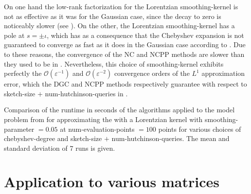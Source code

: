 On one hand the low-rank factorization for the Lorentzian \gls{smoothing-kernel}
is not as effective as it was for the Gaussian case, since the decay to zero
is noticeably slower (see ). On the
other, the Lorentzian \gls{smoothing-kernel} has a pole at $s = \pm \iota$, which
has as a consequence that the Chebyshev expansion is not guaranteed to converge
as fast as it does in the Gaussian case according to .
Due to these reasons, the convergence of the \gls{NC} and \gls{NCPP} methods
are slower than they used to be in .
Nevertheless, this choice of \gls{smoothing-kernel} exhibits perfectly the 
$\mathcal{O}(\varepsilon^{-1})$ and $\mathcal{O}(\varepsilon^{-2})$ convergence
orders of the $L^1$ approximation error, which the \gls{DGC} and \gls{NCPP}
methods respectively guarantee with respect to
\gls{sketch-size} $+$ \gls{num-hutchinson-queries} in .\\

\begin{table}[ht]
    \caption{Comparison of the runtime in seconds of the algorithms applied to the model problem
    from 
    for approximating the  with a Lorentzian kernel with
    \gls{smoothing-parameter} $=0.05$ at \gls{num-evaluation-points} $=100$
    points for various choices of \gls{chebyshev-degree} and \gls{sketch-size} $+$ \gls{num-hutchinson-queries}.
    The mean and standard deviation of 7 runs is given.}
    \label{tab:5-experiments-timing-haydock}
   
\end{table}


\clearpage
\section{Application to various matrices}
\label{sec:5-experiments-various-matrices}

